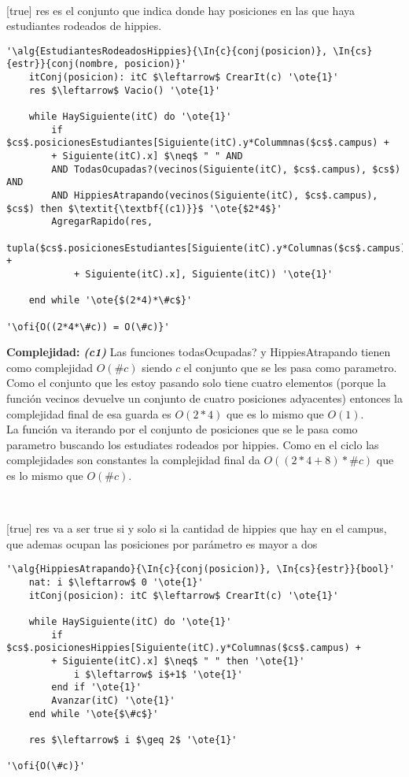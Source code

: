~


[true]
{res es el conjunto que indica donde hay posiciones en las que haya estudiantes rodeados de hippies.}

\begin{lstlisting}[mathescape]
'\alg{EstudiantesRodeadosHippies}{\In{c}{conj(posicion)}, \In{cs}{estr}}{conj(nombre, posicion)}'
	itConj(posicion): itC $\leftarrow$ CrearIt(c) '\ote{1}'
	res $\leftarrow$ Vacio() '\ote{1}'

	while HaySiguiente(itC) do '\ote{1}'
		if $cs$.posicionesEstudiantes[Siguiente(itC).y*Colummnas($cs$.campus) +
		+ Siguiente(itC).x] $\neq$ " " AND
		AND TodasOcupadas?(vecinos(Siguiente(itC), $cs$.campus), $cs$) AND
		AND HippiesAtrapando(vecinos(Siguiente(itC), $cs$.campus), $cs$) then $\textit{\textbf{(c1)}}$ '\ote{$2*4$}'
		AgregarRapido(res,
			tupla($cs$.posicionesEstudiantes[Siguiente(itC).y*Columnas($cs$.campus) +
			+ Siguiente(itC).x], Siguiente(itC)) '\ote{1}'

	end while '\ote{$(2*4)*\#c$}'

'\ofi{O((2*4*\#c)) = O(\#c)}'
\end{lstlisting}

\textbf{Complejidad:} \textit{\textbf{(c1)}} Las funciones todasOcupadas? y HippiesAtrapando tienen como complejidad $O(\#c)$ siendo $c$ el conjunto que se les pasa como parametro. Como el conjunto que les estoy pasando solo tiene cuatro elementos (porque la función vecinos devuelve un conjunto de cuatro posiciones adyacentes) entonces la complejidad final de esa guarda es $O(2*4)$ que es lo mismo que $O(1)$. \\
La función va iterando por el conjunto de posiciones que se le pasa como parametro buscando los estudiates rodeados por hippies. Como en el ciclo las complejidades son constantes la complejidad final da $O((2*4+8)*\#c)$ que es lo mismo que $O(\#c)$.


~


[true]
{res va a ser true si y solo si la cantidad de hippies que hay en el campus, que ademas ocupan las posiciones por parámetro es mayor a dos}

\begin{lstlisting}[mathescape]
'\alg{HippiesAtrapando}{\In{c}{conj(posicion)}, \In{cs}{estr}}{bool}'
	nat: i $\leftarrow$ 0 '\ote{1}'
	itConj(posicion): itC $\leftarrow$ CrearIt(c) '\ote{1}'

	while HaySiguiente(itC) do '\ote{1}'
		if $cs$.posicionesHippies[Siguiente(itC).y*Columnas($cs$.campus) +
		+ Siguiente(itC).x] $\neq$ " " then '\ote{1}'
			i $\leftarrow$ i$+1$ '\ote{1}'
		end if '\ote{1}'
		Avanzar(itC) '\ote{1}'
	end while '\ote{$\#c$}'

	res $\leftarrow$ i $\geq 2$ '\ote{1}'

'\ofi{O(\#c)}'
\end{lstlisting}

